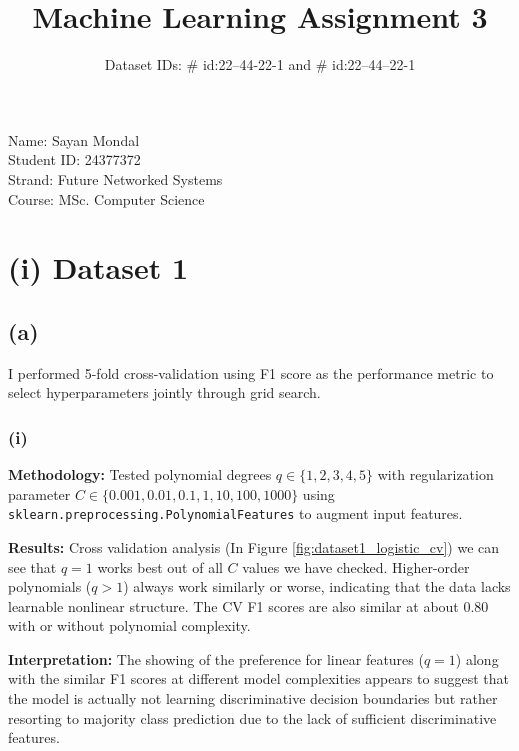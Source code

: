 \documentclass[11pt,a4paper]{article}
\title{Machine Learning Assignment 3}
\author{Dataset IDs: \# id:22--44-22-1 and \# id:22--44--22-1}
\date{}
\begin{document}
\maketitle

\begin{center}
Name: Sayan Mondal\\
Student ID: 24377372\\
Strand: Future Networked Systems\\
Course: MSc. Computer Science
\end{center}
    
\vspace{1em}

\section*{(i) Dataset 1}

\subsection*{(a)}

I performed 5-fold cross-validation using F1 score as the performance metric to select hyperparameters jointly through grid search.

\subsubsection*{(i)}

\textbf{Methodology:} Tested polynomial degrees $q \in \{1, 2, 3, 4, 5\}$ with regularization parameter $C \in \{0.001, 0.01, 0.1, 1, 10, 100, 1000\}$ using \texttt{sklearn.preprocessing.PolynomialFeatures} to augment input features.

\textbf{Results:} 
Cross validation analysis (In Figure \ref{fig:dataset1_logistic_cv}) we can see that $q=1$ works best out of all $C$ values we have checked. Higher-order polynomials ($q>1$) always work similarly or worse, indicating that the data lacks learnable nonlinear structure.
The CV F1 scores are also similar at about 0.80 with or without polynomial complexity.

\textbf{Interpretation:} The showing of the preference for linear features ($q=1$) along with the similar F1 scores at different model complexities appears to suggest that the model is actually not learning discriminative decision boundaries but rather resorting to majority class prediction due to the lack of sufficient discriminative features.
\end{document}
